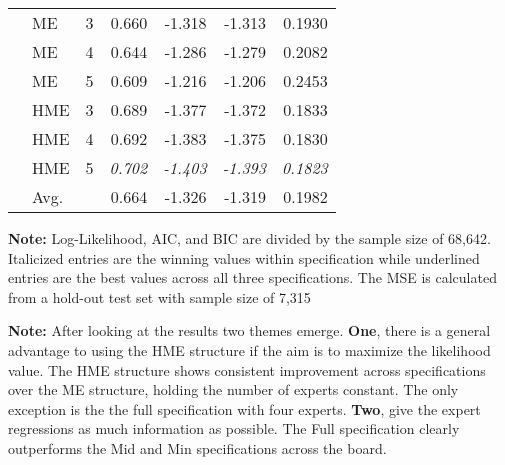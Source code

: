 \documentclass[12pt]{article}
\theoremstyle{definition}
\begin{document}
\begin{table}[b!]
\begin{threeparttable}
{\begin{tabular}[r]{l l l r r r r}
         &  ME   &    3    & 0.660      & -1.318      & -1.313      & 0.1930      \\
         &  ME   &    4    & 0.644      & -1.286      & -1.279      & 0.2082      \\
         &  ME   &    5    & 0.609      & -1.216      & -1.206      & 0.2453      \\
         &  HME  &    3    & 0.689      & -1.377      & -1.372      & 0.1833      \\
         &  HME  &    4    & 0.692      & -1.383      & -1.375      & 0.1830      \\
         &  HME  &    5    & \it{0.702} & \it{-1.403} & \it{-1.393} & \it{0.1823} \\
         \cmidrule(l){2-7}
         &  Avg. &         & 0.664      & -1.326      & -1.319      & 0.1982      \\
        \cmidrule(l){1-7}
    \end{tabular}
    }
    \begin{tablenotes}
      \item{\footnotesize \textbf{Note:} Log-Likelihood, AIC, and BIC are divided by the sample size of 68,642. Italicized entries are the winning values within specification while underlined entries are the best values across all three specifications. The MSE is calculated from a hold-out test set with sample size of 7,315}
      \item{\footnotesize \textbf{Note:} After looking at the results two themes emerge. \textbf{One}, there is a general advantage to using the HME structure if the aim is to maximize the likelihood value. The HME structure shows consistent improvement across specifications over the ME structure, holding the number of experts constant. The only exception is the the full specification with four experts.
      \textbf{Two}, give the expert regressions as much information as possible. The Full specification clearly outperforms the Mid and Min specifications across the board.
      }
      \item{\footnotesize }
    \end{tablenotes} \label{tbl:model_comparison}
  \end{threeparttable}
\end{table}
\end{document}
